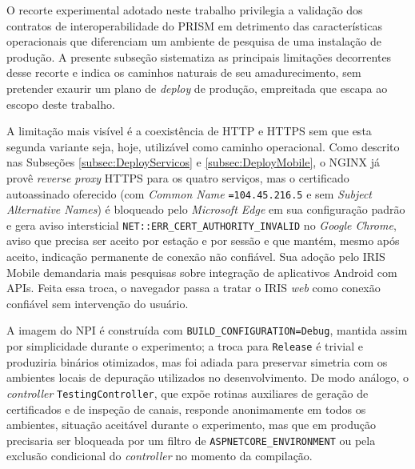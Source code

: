 O recorte experimental adotado neste trabalho privilegia a validação dos contratos de interoperabilidade do PRISM em detrimento das características operacionais que diferenciam um ambiente de pesquisa de uma instalação de produção. A presente subseção sistematiza as principais limitações decorrentes desse recorte e indica os caminhos naturais de seu amadurecimento, sem pretender exaurir um plano de \textit{deploy} de produção, empreitada que escapa ao escopo deste trabalho.

A limitação mais visível é a coexistência de HTTP e HTTPS sem que esta segunda variante seja, hoje, utilizável como caminho operacional. Como descrito nas Subseções \ref{subsec:DeployServicos} e \ref{subsec:DeployMobile}, o NGINX já provê \emph{reverse proxy} HTTPS para os quatro serviços, mas o certificado autoassinado oferecido (com \emph{Common Name} \texttt{=104.45.216.5} e sem \emph{Subject Alternative Names}) é bloqueado pelo \textit{Microsoft Edge} em sua configuração padrão e gera aviso intersticial \texttt{NET::ERR\_CERT\_AUTHORITY\_INVALID} no \textit{Google Chrome}, aviso que precisa ser aceito por estação e por sessão e que mantém, mesmo após aceito, indicação permanente de conexão não confiável. Sua adoção pelo IRIS Mobile demandaria mais pesquisas sobre integração de aplicativos Android com APIs. Feita essa troca, o navegador passa a tratar o IRIS \emph{web} como conexão confiável sem intervenção do usuário.

A imagem do NPI é construída com \texttt{BUILD\_CONFIGURATION=Debug}, mantida assim por simplicidade durante o experimento; a troca para \texttt{Release} é trivial e produziria binários otimizados, mas foi adiada para preservar simetria com os ambientes locais de depuração utilizados no desenvolvimento. De modo análogo, o \textit{controller} \texttt{TestingController}, que expõe rotinas auxiliares de geração de certificados e de inspeção de canais, responde anonimamente em todos os ambientes, situação aceitável durante o experimento, mas que em produção precisaria ser bloqueada por um filtro de \texttt{ASPNETCORE\_ENVIRONMENT} ou pela exclusão condicional do \textit{controller} no momento da compilação.



